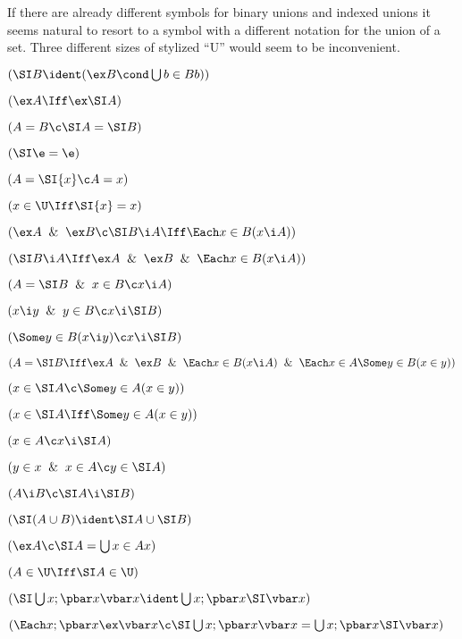 If there are already different symbols for binary unions and indexed unions
it seems natural to resort to a symbol with a different notation for
the union of a set.  Three different sizes of stylized ``U'' would seem to 
be inconvenient.
\lineb


 $(\SI B \ident (\ex B \cond \bigcup b \in B b))$


 $(\ex A \Iff \ex \SI A)$

 $(A = B \c \SI A = \SI B)$

 $(\SI \e = \e)$

 $( A = \SI\{x\} \c A = x)$

 $(x \in \U \Iff \SI\{x\} =  x)$

 $(\ex A \And \ex B \c \SI B \i A \Iff \Each x \in B ( x \i A))$

 $(\SI B \i A \Iff \ex A \And \ex B \And \Each x \in B ( x \i A))$

 $(A = \SI B \And x \in B \c x \i A)$

 $(x \i y \And y \in B \c x \i \SI B)$

 $(\Some y \in B(x \i y)\c x \i \SI B)$

 $(A = \SI B \Iff \ex A \And \ex B \And \Each x \in B(x \i A) \And \Each x \in A\Some y \in B(x \in y))$

 $(x \in \SI A \c \Some y \in A(x \in y))$

 $(x \in \SI A \Iff \Some y \in A (x \in y ))$

 $(x \in A \c x \i \SI A)$

 $(y \in x \And x \in A \c y \in \SI A)$

 $(A \i B \c \SI A \i \SI B)$

 $(\SI(A\cup B) \ident \SI A \cup \SI B)$

 $(\ex A \c \SI A = \bigcup x \in A x)$

 $(A \in \U \Iff \SI A \in \U)$

 $(\SI\bigcup x ;\pbar x \vbar x \ident \bigcup x ;\pbar x \SI\vbar x)$

 $(\Each x;\pbar x\ex\vbar x \c \SI\bigcup x ;\pbar x \vbar x = \bigcup x ;\pbar x \SI\vbar x)$
\lineb


